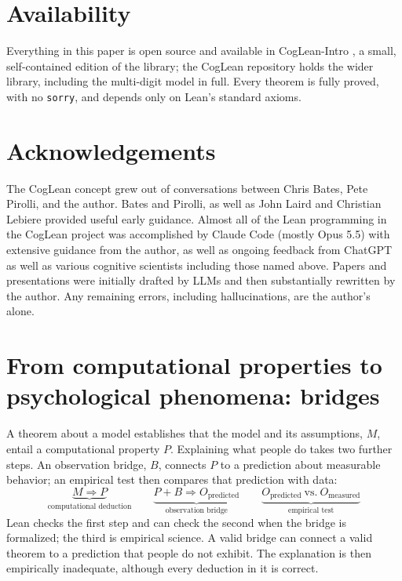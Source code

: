 \documentclass[11pt]{article}
\newcommand{\code}[1]{\texttt{#1}}
\begin{document}
\section{Availability}

Everything in this paper is open source and available in
CogLean-Intro \citep{cogleanintro}, a small,
self-contained edition of the library; the CogLean repository
\citep{coglean} holds the wider library, including the multi-digit
model in full.
Every theorem is fully proved, with no \code{sorry}, and depends only
on Lean's standard axioms.

\section{Acknowledgements}

The CogLean concept grew out of conversations between Chris Bates,
Pete Pirolli, and the author. Bates and Pirolli, as well as John Laird
and Christian Lebiere provided useful early guidance. Almost all of the
Lean programming in the CogLean project was accomplished by Claude
Code (mostly Opus 5.5) with extensive guidance from the author, as
well as ongoing feedback from ChatGPT as well as various cognitive
scientists including those named above. Papers and presentations were
initially drafted by LLMs and then substantially rewritten by the
author. Any remaining errors, including hallucinations, are the
author's alone.




\clearpage
\appendix
\section{From computational properties to psychological phenomena: bridges}
\label{app:bridges}

A theorem about a model establishes that the model and its assumptions, $M$, entail a computational property $P$. Explaining what people do takes two further steps. An observation bridge, $B$, connects $P$ to a prediction about measurable behavior; an empirical test then compares that prediction with data:
\[
\underbrace{M \Rightarrow P}_{\text{computational deduction}}
\qquad
\underbrace{P + B \Rightarrow O_{\text{predicted}}}_{\text{observation bridge}}
\qquad
\underbrace{O_{\text{predicted}}\ \text{vs.}\ O_{\text{measured}}}_{\text{empirical test}}
\]
Lean checks the first step and can check the second when the bridge is formalized; the third is empirical science. A valid bridge can connect a valid theorem to a prediction that people do not exhibit. The explanation is then empirically inadequate, although every deduction in it is correct.
\end{document}
